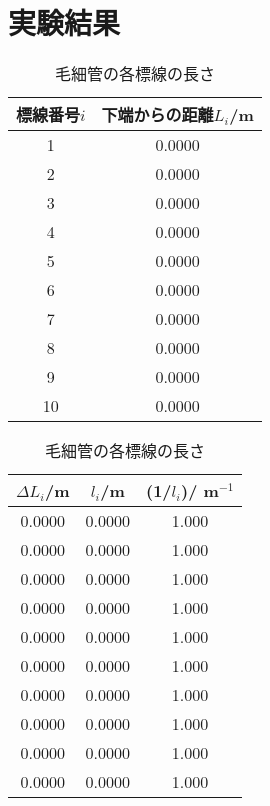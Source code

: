 \documentclass[a4j]{jarticle}
\begin{document}
\section{実験結果}

\begin{table}[htbp]
\caption{毛細管の各標線の長さ}
\begin{tabular}{|c|c|} \hline
標線番号$i$ & 下端からの距離$L_i$/m\\ \hline
1 & 0.0000\\ \hline
2 & 0.0000\\ \hline
3 & 0.0000\\ \hline
4 & 0.0000\\ \hline
5 & 0.0000\\ \hline
6 & 0.0000\\ \hline
7 & 0.0000\\ \hline
8 & 0.0000\\ \hline
9 & 0.0000\\ \hline
10 & 0.0000\\ \hline

\end{tabular}%
\begin{tabular}{|c|c|c|} \hline 
$\Delta L_i$/m & $l_i$/m & (1/$l_i$)/ m$^{-1}$ \\  \hline
0.0000 & 0.0000 & 1.000\\ \hline
0.0000 & 0.0000 & 1.000\\ \hline
0.0000 & 0.0000 & 1.000\\ \hline
0.0000 & 0.0000 & 1.000\\ \hline
0.0000 & 0.0000 & 1.000\\ \hline
0.0000 & 0.0000 & 1.000\\ \hline
0.0000 & 0.0000 & 1.000\\ \hline
0.0000 & 0.0000 & 1.000\\ \hline
0.0000 & 0.0000 & 1.000\\ \hline
0.0000 & 0.0000 & 1.000\\ \hline
\end{tabular}
\end{table}
\end{document}
